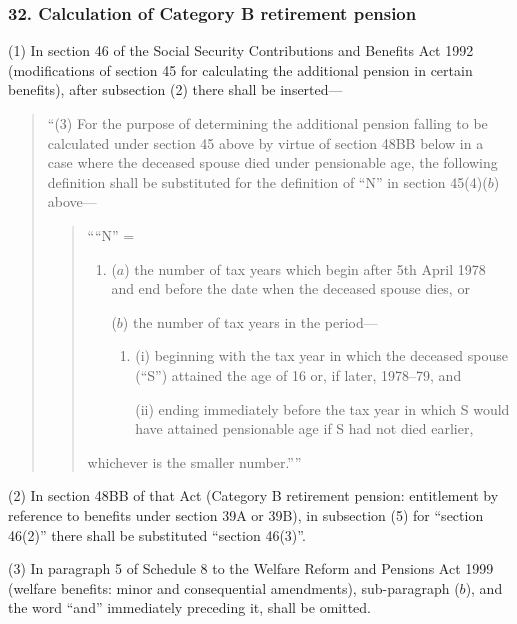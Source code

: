 \documentclass[12pt,a4paper]{article}
\begin{document}

\subsubsection{32. Calculation of Category B retirement pension}

(1) In section 46 of the Social Security Contributions and Benefits Act 1992 (modifications of section 45 for calculating the additional pension in certain benefits), after subsection (2)  there shall be inserted—
\begin{quotation}
“(3) For the purpose of determining the additional pension falling to be calculated under section 45 above by virtue of section 48BB below in a case where the deceased spouse died under pensionable age, the following definition shall be substituted for the definition of “N” in section 45(4)($b$)  above—
\begin{quotation}
    ““N” =
\begin{enumerate}\item[]
    ($a$) 
    the number of tax years which begin after 5th April 1978 and end before the date when the deceased spouse dies, or

    ($b$) 
    the number of tax years in the period—
\begin{enumerate}\item[]
    (i) 
    beginning with the tax year in which the deceased spouse (“S”) attained the age of 16 or, if later, 1978--79, and

    (ii) 
    ending immediately before the tax year in which S would have attained pensionable age if S had not died earlier,
\end{enumerate}
\end{enumerate}
    whichever is the smaller number.”” 
\end{quotation}
\end{quotation}

(2) In section 48BB of that Act (Category B retirement pension: entitlement by reference to benefits under section 39A or 39B), in subsection (5)  for “section 46(2)” there shall be substituted “section 46(3)”.

(3) In paragraph 5 of Schedule 8 to the Welfare Reform and Pensions Act 1999 (welfare benefits: minor and consequential amendments), sub-paragraph ($b$), and the word “and” immediately preceding it, shall be omitted.

\end{document}
